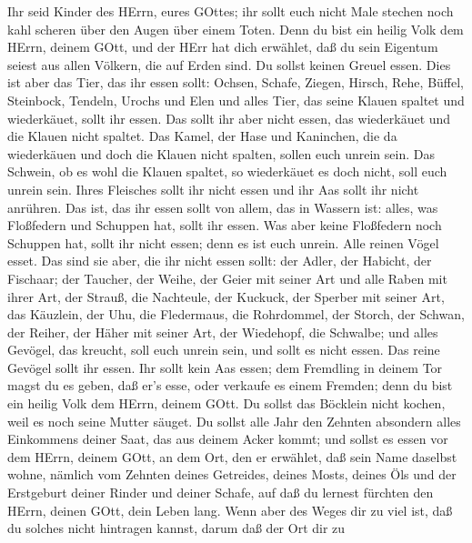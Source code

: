  Ihr seid Kinder des HErrn, eures GOttes; ihr sollt euch
nicht Male stechen noch kahl scheren über den Augen über einem Toten.
 Denn du bist ein heilig Volk dem HErrn, deinem GOtt, und
der HErr hat dich erwählet, daß du sein Eigentum seiest aus allen
Völkern, die auf Erden sind.  Du sollst keinen Greuel essen.
 Dies ist aber das Tier, das ihr essen sollt: Ochsen,
Schafe, Ziegen,  Hirsch, Rehe, Büffel, Steinbock, Tendeln,
Urochs und Elen  und alles Tier, das seine Klauen spaltet
und wiederkäuet, sollt ihr essen.  Das sollt ihr aber nicht
essen, das wiederkäuet und die Klauen nicht spaltet. Das Kamel, der Hase
und Kaninchen, die da wiederkäuen und doch die Klauen nicht spalten,
sollen euch unrein sein.  Das Schwein, ob es wohl die Klauen
spaltet, so wiederkäuet es doch nicht, soll euch unrein sein. Ihres
Fleisches sollt ihr nicht essen und ihr Aas sollt ihr nicht anrühren.
 Das ist, das ihr essen sollt von allem, das in Wassern ist:
alles, was Floßfedern und Schuppen hat, sollt ihr essen. 
Was aber keine Floßfedern noch Schuppen hat, sollt ihr nicht essen; denn
es ist euch unrein.  Alle reinen Vögel esset. 
Das sind sie aber, die ihr nicht essen sollt: der Adler, der Habicht,
der Fischaar;  der Taucher, der Weihe, der Geier mit seiner
Art  und alle Raben mit ihrer Art,  der
Strauß, die Nachteule, der Kuckuck, der Sperber mit seiner Art,
 das Käuzlein, der Uhu, die Fledermaus,  die
Rohrdommel, der Storch, der Schwan,  der Reiher, der Häher
mit seiner Art, der Wiedehopf, die Schwalbe;  und alles
Gevögel, das kreucht, soll euch unrein sein, und sollt es nicht essen.
 Das reine Gevögel sollt ihr essen.  Ihr sollt
kein Aas essen; dem Fremdling in deinem Tor magst du es geben, daß er's
esse, oder verkaufe es einem Fremden; denn du bist ein heilig Volk dem
HErrn, deinem GOtt. Du sollst das Böcklein nicht kochen, weil es noch
seine Mutter säuget.  Du sollst alle Jahr den Zehnten
absondern alles Einkommens deiner Saat, das aus deinem Acker kommt;
 und sollst es essen vor dem HErrn, deinem GOtt, an dem
Ort, den er erwählet, daß sein Name daselbst wohne, nämlich vom Zehnten
deines Getreides, deines Mosts, deines Öls und der Erstgeburt deiner
Rinder und deiner Schafe, auf daß du lernest fürchten den HErrn, deinen
GOtt, dein Leben lang.  Wenn aber des Weges dir zu viel
ist, daß du solches nicht hintragen kannst, darum daß der Ort dir zu
